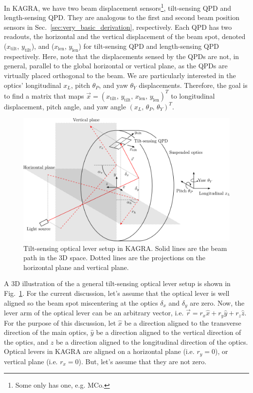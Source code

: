In KAGRA, we have two beam displacement sensors\footnote{Some only has one, e.g. MCo.}, tilt-sensing QPD and length-sensing QPD. They are analogous to the first and second beam position sensors in Sec.~\ref{sec:very_basic_derivation}, respectively.
Each QPD has two readouts, the horizontal and the vertical displacement of the beam spot, denoted ($x_\mathrm{tilt}$, $y_\mathrm{tilt}$), and ($x_\mathrm{len}$, $y_\mathrm{len}$) for tilt-sensing QPD and length-sensing QPD respectively.
Here, note that the displacements sensed by the QPDs are not, in general, parallel to the global horizontal or vertical plane, as the QPDs are virtually placed orthogonal to the beam.
We are particularly interested in the optics' longitudinal $x_L$, pitch $\theta_P$, and yaw $\theta_Y$ displacements.
Therefore, the goal is to find a matrix that maps $\vec{x}=\left(x_\mathrm{tilt},\, y_\mathrm{tilt},\, x_\mathrm{len},\, y_\mathrm{len}\right)^T$ to longitudinal displacement, pitch angle, and yaw angle $\left(x_L,\, \theta_P,\, \theta_Y\right)^T$.

\begin{figure}[!h]
	\centering
	\includegraphics[width=0.7\linewidth]{figures/kagra_optical_lever_3d}
	\caption{Tilt-sensing optical lever setup in KAGRA. Solid lines are the beam path in the 3D space. Dotted lines are the projections on the horizontal plane and vertical plane.}
	\label{fig:kagraopticallever3d}
\end{figure}

A 3D illustration of the a general tilt-sensing optical lever setup is shown in Fig.~\ref{fig:kagraopticallever3d}.
For the current discussion, let's assume that the optical lever is well aligned so the beam spot miscentering at the optics $\delta_x$ and $\delta_y$ are zero.
Now, the lever arm of the optical lever can be an arbitrary vector, i.e. $\vec{r}=r_x\hat{x}+r_y\hat{y}+r_z\hat{z}$.
For the purpose of this discussion, let $\hat{x}$ be a direction aligned to the transverse direction of the main optics, $\hat{y}$ be a direction aligned to the vertical direction of the optics, and $\hat{z}$ be a direction aligned to the longitudinal direction of the optics.
Optical levers in KAGRA are aligned on a horizontal plane (i.e. $r_y=0$), or vertical plane (i.e. $r_x=0$).
But, let's assume that they are not zero.

